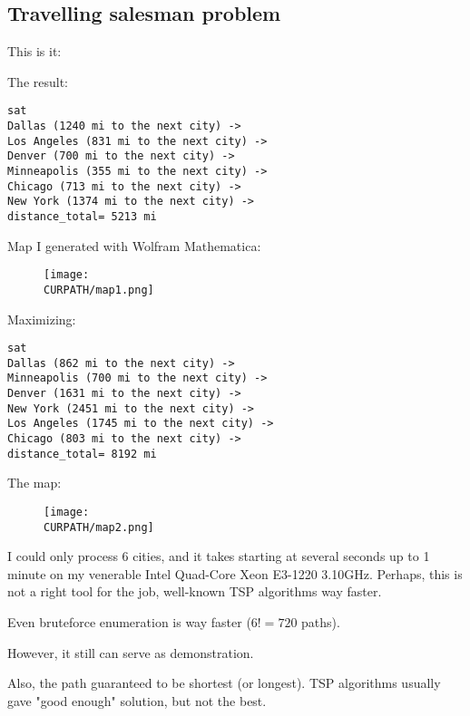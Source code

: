 \subsection{Travelling salesman problem}

\renewcommand{\CURPATH}{MaxSMT/TSP}

This is it:



The result:

\begin{lstlisting}
sat
Dallas (1240 mi to the next city) ->
Los Angeles (831 mi to the next city) ->
Denver (700 mi to the next city) ->
Minneapolis (355 mi to the next city) ->
Chicago (713 mi to the next city) ->
New York (1374 mi to the next city) ->
distance_total= 5213 mi
\end{lstlisting}

Map I generated with Wolfram Mathematica:

\begin{figure}[H]
\centering
\texttt{[image: \\CURPATH/map1.png]}
\caption{}
\end{figure}

Maximizing:

\begin{lstlisting}
sat
Dallas (862 mi to the next city) ->
Minneapolis (700 mi to the next city) ->
Denver (1631 mi to the next city) ->
New York (2451 mi to the next city) ->
Los Angeles (1745 mi to the next city) ->
Chicago (803 mi to the next city) ->
distance_total= 8192 mi
\end{lstlisting}

The map:

\begin{figure}[H]
\centering
\texttt{[image: \\CURPATH/map2.png]}
\caption{}
\end{figure}

I could only process 6 cities, and it takes starting at several seconds up to 1 minute on my venerable Intel Quad-Core Xeon E3-1220 3.10GHz.
Perhaps, this is not a right tool for the job, well-known TSP algorithms way faster.

Even bruteforce enumeration is way faster ($6!=720$ paths).

However, it still can serve as demonstration.

Also, the path guaranteed to be shortest (or longest).
TSP algorithms usually gave "good enough" solution, but not the best.

